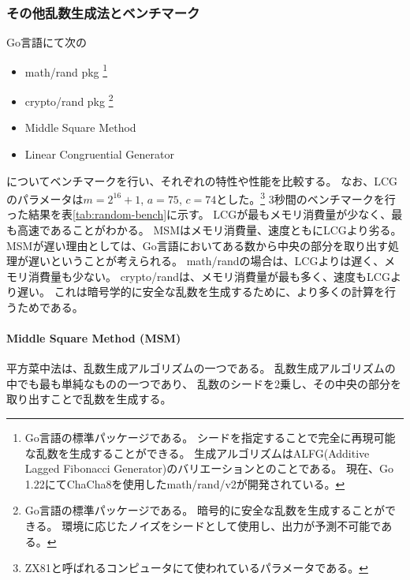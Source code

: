\documentclass[../../../main]{subfiles}
\begin{document}
\subsubsection{その他乱数生成法とベンチマーク}
Go言語にて次の
\begin{itemize}
	\item math/rand pkg \footnote{
		      Go言語の標準パッケージである。
		      シードを指定することで完全に再現可能な乱数を生成することができる。
		      生成アルゴリズムはALFG(Additive Lagged Fibonacci Generator)のバリエーションとのことである。
		      現在、Go 1.22にてChaCha8を使用したmath/rand/v2が開発されている。\cite{salsa20}\cite{go-math-rand-v2}
	      }
	\item crypto/rand pkg \footnote{
		      Go言語の標準パッケージである。
		      暗号的に安全な乱数を生成することができる。
		      環境に応じたノイズをシードとして使用し、出力が予測不可能である。
	      }
	\item Middle Square Method
	\item Linear Congruential Generator
\end{itemize}
についてベンチマークを行い、それぞれの特性や性能を比較する。
なお、LCGのパラメータは$m=2^{16} + 1$, $a=75$, $c=74$とした。\footnote{
	ZX81と呼ばれるコンピュータにて使われているパラメータである。
}
3秒間のベンチマークを行った結果を表\ref{tab:random-bench}に示す。
LCGが最もメモリ消費量が少なく、最も高速であることがわかる。
MSMはメモリ消費量、速度ともにLCGより劣る。
MSMが遅い理由としては、Go言語においてある数から中央の部分を取り出す処理が遅いということが考えられる。
math/randの場合は、LCGよりは遅く、メモリ消費量も少ない。
crypto/randは、メモリ消費量が最も多く、速度もLCGより遅い。
これは暗号学的に安全な乱数を生成するために、より多くの計算を行うためである。

\paragraph{Middle Square Method (MSM)}
平方菜中法は、乱数生成アルゴリズムの一つである。
乱数生成アルゴリズムの中でも最も単純なものの一つであり、
乱数のシードを2乗し、その中央の部分を取り出すことで乱数を生成する。

\end{document}
